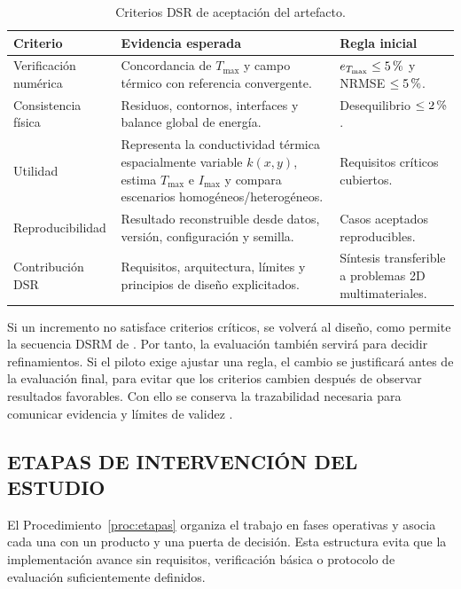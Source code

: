 \documentclass[11pt,a4paper,oneside]{report}
\newcommand{\Tmax}{T_{\max}}
\newcommand{\Imax}{I_{\max}}
\newcommand{\kx}{k(x,y)}
\newcommand{\pct}{\mbox{\char37}}
\begin{document}
\begin{table}[htbp]
\centering
\caption{Criterios DSR de aceptación del artefacto.}
\label{tab:criterios}
\begin{tabularx}{\textwidth}{L{3.1cm}Y L{3.0cm}}
\toprule
\textbf{Criterio} & \textbf{Evidencia esperada} & \textbf{Regla inicial} \\
\midrule
Verificación numérica & Concordancia de $\Tmax$ y campo térmico con referencia convergente. & $e_{T_{\max}}\leq5\,\pct$ y NRMSE $\leq5\,\pct$. \\
Consistencia física & Residuos, contornos, interfaces y balance global de energía. & Desequilibrio $\leq2\,\pct$. \\
Utilidad & Representa la conductividad térmica espacialmente variable $\kx$, estima $\Tmax$ e $\Imax$ y compara escenarios homogéneos/heterogéneos. & Requisitos críticos cubiertos. \\
Reproducibilidad & Resultado reconstruible desde datos, versión, configuración y semilla. & Casos aceptados reproducibles. \\
Contribución DSR & Requisitos, arquitectura, límites y principios de diseño explicitados. & Síntesis transferible a problemas 2D multimateriales. \\
\bottomrule
\end{tabularx}
\end{table}

Si un incremento no satisface criterios críticos, se volverá al diseño, como permite la secuencia DSRM de \textcite[56]{peffers2007}. Por tanto, la evaluación también servirá para decidir refinamientos. Si el piloto exige ajustar una regla, el cambio se justificará antes de la evaluación final, para evitar que los criterios cambien después de observar resultados favorables. Con ello se conserva la trazabilidad necesaria para comunicar evidencia y límites de validez \parencite[350--351]{gregor2013}.

\subsection{ETAPAS DE INTERVENCIÓN DEL ESTUDIO}

El Procedimiento~\ref{proc:etapas} organiza el trabajo en fases operativas y asocia cada una con un producto y una puerta de decisión. Esta estructura evita que la implementación avance sin requisitos, verificación básica o protocolo de evaluación suficientemente definidos.
\end{document}

